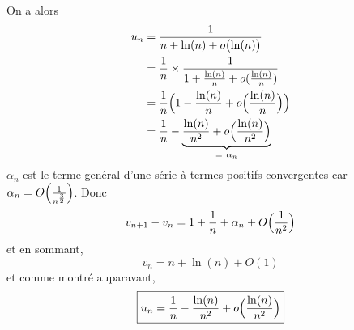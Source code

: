 \begin{solution}
\begin{enumerate}
		On a alors 
		\begin{align*}
			u_{n}
			&=\frac{1}{n+\ln(n)+o\bigl(\ln(n)\bigr)}\\
			&=\frac{1}{n}\times\frac{1}{1+\frac{\ln(n)}{n}+o(\frac{\ln(n)}{n})}\\
			&=\frac{1}{n}\Bigl(1-\frac{\ln(n)}{n}+o\Bigl(\frac{\ln(n)}{n}\Bigr)\Bigr)\\
			&=\frac{1}{n}-\underbrace{\frac{\ln(n)}{n^{2}}+o\Bigl(\frac{\ln(n)}{n^{2}}\Bigr)}_{=~\alpha_{n}}
		\end{align*}
		$\alpha_{n}$ est le terme genéral d'une série à termes positifs convergentes car $\alpha_{n}=O\Bigl(\frac{1}{n^{\frac{3}{2}}}\Bigr)$. Donc 
		$$v_{n+1}-v_{n}=1+\frac{1}{n}+\alpha_{n}+O\Bigl(\frac{1}{n^{2}}\Bigr)$$
		et en sommant,
		$$\boxed{v_{n}=n+\ln(n)+O(1)}$$
		et comme montré auparavant,
		$$\boxed{u_{n}=\frac{1}{n}-\frac{\ln(n)}{n^{2}}+o\Bigl(\frac{\ln(n)}{n^{2}}\Bigr)}$$
	\end{enumerate}
\end{solution}

